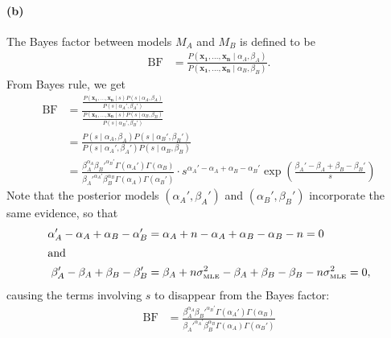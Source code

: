 \documentclass[a4paper,11pt]{article}
\DeclareMathOperator{\given}{\mid}
\begin{document}
\paragraph{(b)} The Bayes factor between models $M_A$ and $M_B$ is defined to be
\begin{align*}
\mathrm{BF}&=
  \frac{
    P(\mathbf{x_1},\dots,\mathbf{x_n}\given\alpha_A,\beta_A)
  }{
    P(\mathbf{x_1},\dots,\mathbf{x_n}\given\alpha_B,\beta_B)
  }.
\end{align*}
From Bayes rule, we get
\begin{align*}
\mathrm{BF}&=
  \frac{
    \frac{
      P(\mathbf{x_1},\dots,\mathbf{x_n}\given s)P(s\given\alpha_A,\beta_A)      
    }{
      P(s\given\alpha_A',\beta_A')
    }
  }{
    \frac{
      P(\mathbf{x_1},\dots,\mathbf{x_n}\given s)P(s\given\alpha_B,\beta_B)      
    }{
      P(s\given\alpha_B',\beta_B')
    }
  }\\
&=
  \frac{
    P(s\given\alpha_A,\beta_A)P(s\given\alpha_B',\beta_B')
  }{
    P(s\given\alpha_A',\beta_A')P(s\given\alpha_B,\beta_B)
  }\\
&=
  \frac{
    \beta_A^{\alpha_A}\beta_B'^{\alpha_B'}
    \Gamma(\alpha_A')\Gamma(\alpha_B)
  }{
    \beta_A'^{\alpha_A'}\beta_B^{\alpha_B}
    \Gamma(\alpha_A)\Gamma(\alpha_B')
  }
  \cdot
  s^{\alpha_A'-\alpha_A+\alpha_B-\alpha_B'}
  \exp\left(
    \frac{
      \beta_A'-\beta_A+\beta_B-\beta_B'
    }{
      s
    }
  \right)
\end{align*}
Note that the posterior models $(\alpha_A', \beta_A')$ and $(\alpha_B', \beta_B')$ incorporate the same evidence, so that
\begin{align*}
  \alpha_A'-\alpha_A+\alpha_B-\alpha_B'&=
  \alpha_A+n-\alpha_A+\alpha_B-\alpha_B-n=0\\
  \intertext{and}
  \beta_A'-\beta_A+\beta_B-\beta_B'&=
  \beta_A+n\sigma_\mathrm{\scriptscriptstyle{MLE}}^2-\beta_A+\beta_B-\beta_B-n\sigma_\mathrm{\scriptscriptstyle{MLE}}^2=0,
\end{align*}
causing the terms involving $s$ to disappear from the Bayes factor:
\begin{align*}
\mathrm{BF}&=
  \frac{
    \beta_A^{\alpha_A}\beta_B'^{\alpha_B'}
    \Gamma(\alpha_A')\Gamma(\alpha_B)
  }{
    \beta_A'^{\alpha_A'}\beta_B^{\alpha_B}
    \Gamma(\alpha_A)\Gamma(\alpha_B')
  }
\end{align*}
\end{document}
